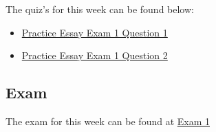 The quiz's for this week can be found below: 

\begin{itemize}
    \item \href{https://applied.cs.colorado.edu/mod/quiz/view.php?id=51649}{Practice Essay Exam 1 Question 1}  
    \item \href{https://applied.cs.colorado.edu/mod/quiz/view.php?id=51669}{Practice Essay Exam 1 Question 2}  
\end{itemize}

\subsection{Exam}

The exam for this week can be found at \href{https://applied.cs.colorado.edu/mod/quiz/view.php?id=52027}{Exam 1}  